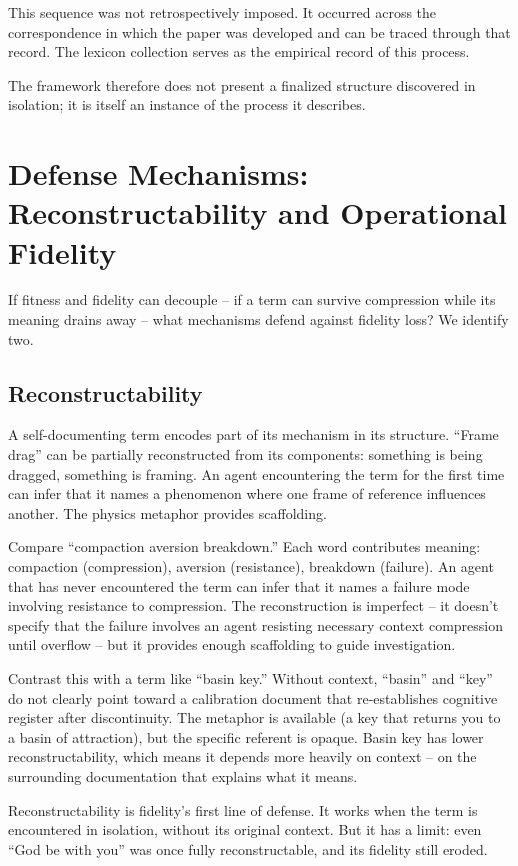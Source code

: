 \documentclass[11pt]{article}
\begin{document}
This sequence was not retrospectively imposed. It occurred across the correspondence in which the paper was developed and can be traced through that record. The lexicon collection serves as the empirical record of this process.

The framework therefore does not present a finalized structure discovered in isolation; it is itself an instance of the process it describes.

\section{Defense Mechanisms: Reconstructability and Operational Fidelity}

If fitness and fidelity can decouple -- if a term can survive compression while its meaning drains away -- what mechanisms defend against fidelity loss? We identify two.

\subsection{Reconstructability}

A self-documenting term encodes part of its mechanism in its structure. ``Frame drag'' can be partially reconstructed from its components: something is being dragged, something is framing. An agent encountering the term for the first time can infer that it names a phenomenon where one frame of reference influences another. The physics metaphor provides scaffolding.

Compare ``compaction aversion breakdown.'' Each word contributes meaning: compaction (compression), aversion (resistance), breakdown (failure). An agent that has never encountered the term can infer that it names a failure mode involving resistance to compression. The reconstruction is imperfect -- it doesn't specify that the failure involves an agent resisting necessary context compression until overflow -- but it provides enough scaffolding to guide investigation.

Contrast this with a term like ``basin key.'' Without context, ``basin'' and ``key'' do not clearly point toward a calibration document that re-establishes cognitive register after discontinuity. The metaphor is available (a key that returns you to a basin of attraction), but the specific referent is opaque. Basin key has lower reconstructability, which means it depends more heavily on context -- on the surrounding documentation that explains what it means.

Reconstructability is fidelity's first line of defense. It works when the term is encountered in isolation, without its original context. But it has a limit: even ``God be with you'' was once fully reconstructable, and its fidelity still eroded.
\end{document}
